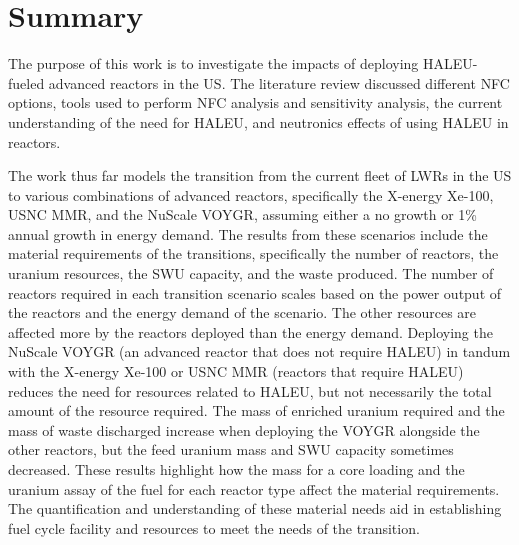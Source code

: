 \section{Summary}
The purpose of this work is to investigate the impacts of 
deploying \gls{HALEU}-fueled advanced reactors in the US. The literature 
review discussed different \gls{NFC} options, tools used to perform 
\gls{NFC} analysis and sensitivity analysis, 
the current understanding of the need for \gls{HALEU}, and neutronics 
effects of using \gls{HALEU} in reactors. 

The work thus far models the transition from the current fleet of 
\glspl{LWR} in the US to various combinations of advanced reactors, 
specifically the X-energy Xe-100, \gls{USNC} \gls{MMR}, and the 
NuScale VOYGR, assuming either a no growth or 1\% annual growth in 
energy demand. The results from these scenarios include the material 
requirements of the transitions, specifically the number of reactors, the 
uranium resources, the \gls{SWU} 
capacity, and the waste produced. The number of reactors required 
in each transition scenario scales based on the power output of the 
reactors and the energy demand of the scenario. The other resources are 
affected more by the reactors deployed than the energy demand. Deploying the 
NuScale VOYGR (an advanced reactor that does not require \gls{HALEU}) 
in tandum with the X-energy Xe-100 or \gls{USNC} \gls{MMR} (reactors 
that require \gls{HALEU}) reduces the need for resources related to 
\gls{HALEU}, but not necessarily the total amount of the resource required. 
The mass of enriched uranium required and the mass of waste discharged 
increase when deploying the VOYGR alongside the other reactors, but the 
feed uranium mass and \gls{SWU} capacity sometimes decreased. These results 
highlight how the mass for a core loading and the 
uranium assay of the fuel for each reactor type affect the material 
requirements. The 
quantification and understanding of these material needs aid in 
establishing fuel cycle facility and resources to meet the needs of 
the transition. 

